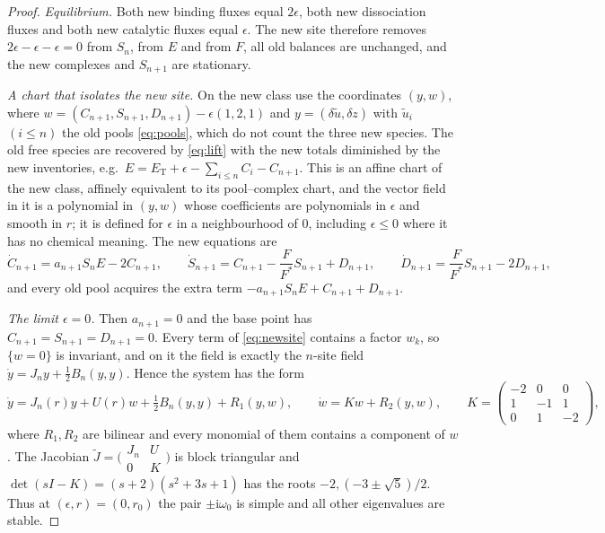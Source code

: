 \documentclass[11pt,a4paper]{article}
\theoremstyle{plain}
\theoremstyle{definition}
\theoremstyle{remark}
\newcommand{\ii}{\mathrm i}
\newcommand{\ET}{E_{\mathrm T}}
\begin{document}
\begin{proof}
\emph{Equilibrium.} Both new binding fluxes equal $2\epsilon$, both new dissociation fluxes and both new catalytic fluxes equal $\epsilon$. The new site therefore removes $2\epsilon-\epsilon-\epsilon=0$ from $S_n$, from $E$ and from $F$, all old balances are unchanged, and the new complexes and $S_{n+1}$ are stationary.

\emph{A chart that isolates the new site.} On the new class use the coordinates $(y,w)$, where $w=(C_{n+1},S_{n+1},D_{n+1})-\epsilon(1,2,1)$ and $y=(\delta\tilde u,\delta z)$ with $\tilde u_i$ $(i\le n)$ the old pools \eqref{eq:pools}, which do not count the three new species. The old free species are recovered by \eqref{eq:lift} with the new totals diminished by the new inventories, e.g.\ $E=\ET+\epsilon-\sum_{i\le n}C_i-C_{n+1}$. This is an affine chart of the new class, affinely equivalent to its pool--complex chart, and the vector field in it is a polynomial in $(y,w)$ whose coefficients are polynomials in $\epsilon$ and smooth in $r$; it is defined for $\epsilon$ in a neighbourhood of $0$, including $\epsilon\le0$ where it has no chemical meaning. The new equations are
\begin{equation}\label{eq:newsite}
 \dot C_{n+1}=a_{n+1}S_nE-2C_{n+1},\qquad \dot S_{n+1}=C_{n+1}-\frac{F}{F^*}S_{n+1}+D_{n+1},\qquad \dot D_{n+1}=\frac{F}{F^*}S_{n+1}-2D_{n+1},
\end{equation}
and every old pool acquires the extra term $-a_{n+1}S_nE+C_{n+1}+D_{n+1}$.

\emph{The limit $\epsilon=0$.} Then $a_{n+1}=0$ and the base point has $C_{n+1}=S_{n+1}=D_{n+1}=0$. Every term of \eqref{eq:newsite} contains a factor $w_k$, so $\{w=0\}$ is invariant, and on it the field is exactly the $n$-site field $\dot y=J_ny+\tfrac12B_n(y,y)$. Hence the system has the form
\begin{equation}\label{eq:triangular}
 \dot y=J_n(r)y+U(r)w+\tfrac12B_n(y,y)+R_1(y,w),\qquad \dot w=Kw+R_2(y,w),\qquad
 K=\begin{pmatrix}-2&0&0\\1&-1&1\\0&1&-2\end{pmatrix},
\end{equation}
where $R_1,R_2$ are bilinear and every monomial of them contains a component of $w$. The Jacobian $\tilde J=\bigl(\begin{smallmatrix}J_n&U\\0&K\end{smallmatrix}\bigr)$ is block triangular and $\det(sI-K)=(s+2)(s^2+3s+1)$ has the roots $-2,(-3\pm\sqrt5)/2$. Thus at $(\epsilon,r)=(0,r_0)$ the pair $\pm\ii\omega_0$ is simple and all other eigenvalues are stable.


\end{proof}
\end{document}
